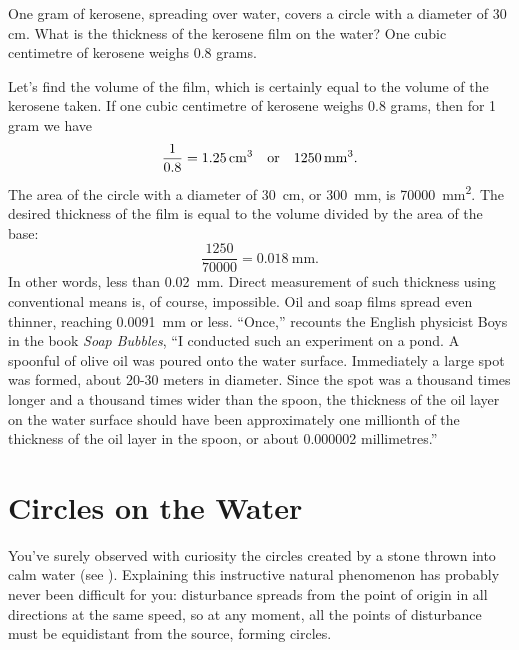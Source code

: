\ques One gram of kerosene, spreading over water, covers a circle with a diameter of 30 cm. What is the thickness of the kerosene film on the water? One cubic centimetre of kerosene weighs 0.8 grams.

\ans Let's find the volume of the film, which is certainly equal to the volume of the kerosene taken. If one cubic centimetre of kerosene weighs 0.8 grams, then for 1 gram we have 
\begin{equation*}%
\frac{1}{0.8} = \SI{1.25}{\centi\meter\cubed} \qor \SI{1250}{\milli\meter\cubed}.
\end{equation*}
The area of the circle with a diameter of \SI{30}{\centi\meter}, or \SI{300}{\milli\meter}, is  \SI{70000}{\milli\meter\squared}. The desired thickness of the film is equal to the volume divided by the area of the base:
\begin{equation*}%
\frac{1250}{70000} = \SI{0.018}{\milli\meter}.
\end{equation*}
In other words, less than \SI{0.02}{\milli\meter}. Direct measurement of such thickness using conventional means is, of course, impossible. Oil and soap films spread even thinner, reaching \SI{0.0091}{\milli\meter} or less. ``Once,'' recounts the English physicist Boys in the book \emph{Soap Bubbles}, ``I conducted such an experiment on a pond. A spoonful of olive oil was poured onto the water surface. Immediately a large spot was formed, about 20-30 meters in diameter. Since the spot was a thousand times longer and a thousand times wider than the spoon, the thickness of the oil layer on the water surface should have been approximately one millionth of the thickness of the oil layer in the spoon, or about 0.000002 millimetres.''


\section{Circles on the Water}
\label{sec-2.11}
\ques You've surely observed with curiosity the circles created by a stone thrown into calm water (see ). Explaining this instructive natural phenomenon has probably never been difficult for you: disturbance spreads from the point of origin in all directions at the same speed, so at any moment, all the points of disturbance must be equidistant from the source, forming circles.

